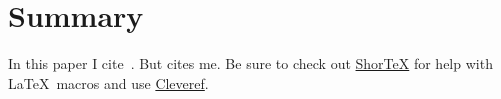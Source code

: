 

\section{Summary}


In this paper I cite~\citep{james:2005}. But \citet{james:2005} cites me. Be
sure to check out
\href{https://github.com/trevorcampbell/shortex/blob/main/shortex.pdf}{ShorTeX}
for help with \LaTeX\ macros and use
\href{https://www.ctan.org/pkg/cleveref}{Cleveref}.